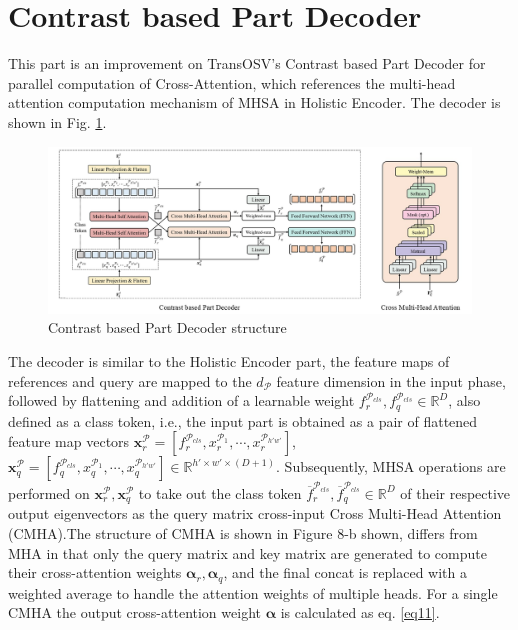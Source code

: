 \section{Contrast based Part Decoder}

This part is an improvement on TransOSV's Contrast based Part Decoder \cite{41} for parallel computation of Cross-Attention, which references the multi-head attention computation mechanism of MHSA in Holistic Encoder. The decoder is shown in Fig. \ref{fig:decoder}.

\begin{figure}[H]
  \centering
      \includegraphics[scale=0.44]{figure/decoder.png}
  \caption{Contrast based Part Decoder structure}
  \label{fig:decoder}
\end{figure}

The decoder is similar to the Holistic Encoder part, the feature maps of references and query are mapped to the $d_\mathcal{P}$ feature dimension in the input phase, followed by flattening and addition of a learnable weight $f_r^{\mathcal{P}_{cls}},f_q^{\mathcal{P}_{cls}} \in \mathbb{R}^D$, also defined as a class token, i.e., the input part is obtained as a pair of flattened feature map vectors $\boldsymbol{x}_r^\mathcal{P} = [f_r^{\mathcal{P}_{cls}}, x_r^{\mathcal{P}_1},\cdots ,x_r^{\mathcal{P}_{h' w' }} ]$, $\boldsymbol{x}_q^\mathcal{P}=[f_q^{\mathcal{P}_{cls}},x_q^{\mathcal{P}_1},\cdots,x_q^{\mathcal{P}_{h'w'} } ] \in \mathbb{R}^{h' \times w' \times (D+1)}$. Subsequently, MHSA operations are performed on $\boldsymbol{x}_r^\mathcal{P},\boldsymbol{x}_q^\mathcal{P}$ to take out the class token $\overline{f}_r^{\mathcal{P}_{cls}},\overline{f}_q^{\mathcal{P}_{cls}} \in \mathbb{R}^D$ of their respective output eigenvectors as the query matrix cross-input Cross Multi-Head Attention (CMHA).The structure of CMHA is shown in Figure 8-b shown, differs from MHA in that only the query matrix and key matrix are generated to compute their cross-attention weights $\boldsymbol{\alpha}_r,\boldsymbol{\alpha}_q$, and the final concat is replaced with a weighted average to handle the attention weights of multiple heads. For a single CMHA the output cross-attention weight $\boldsymbol{\alpha}$ is calculated as eq. \ref{eq11}.

